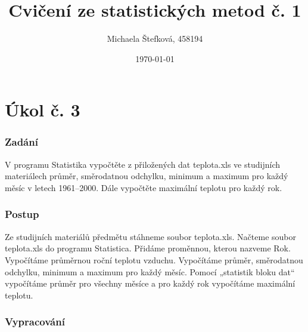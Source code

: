 \documentclass{article}
\title{Cvičení ze statistických metod č. 1} %
\author{Michaela Štefková, 458194} %
\date{\today} %
\begin{document}
	
	\maketitle %
	
	\part*{Úkol č. 3}
	\section*{Zadání} %
	
	V programu Statistika vypočtěte z přiložených dat teplota.xls ve studijních materiálech průměr, směrodatnou odchylku, minimum a maximum pro každý měsíc v letech 1961--2000. Dále vypočtěte maximální teplotu pro každý rok.
	
	
	\section*{Postup} %
	
	Ze studijních materiálů předmětu stáhneme soubor teplota.xls. Načteme soubor teplota.xls do programu Statistica. Přidáme proměnnou, kterou nazveme Rok. Vypočítáme průměrnou roční teplotu vzduchu. Vypočítáme průměr, směrodatnou odchylku, minimum a maximum pro každý měsíc. 
	Pomocí „statistik bloku dat“ vypočítáme průměr pro všechny měsíce a pro každý rok vypočítáme maximální teplotu.
	
	\section*{Vypracování}
	
\end{document}
